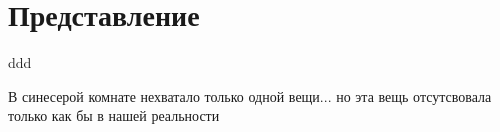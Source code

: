 \newpage
\chapter{Представление}
{\centering
	ddd\par
}
В синесерой комнате нехватало только одной вещи... 
но эта вещь отсутсвовала только как бы в нашей реальности
